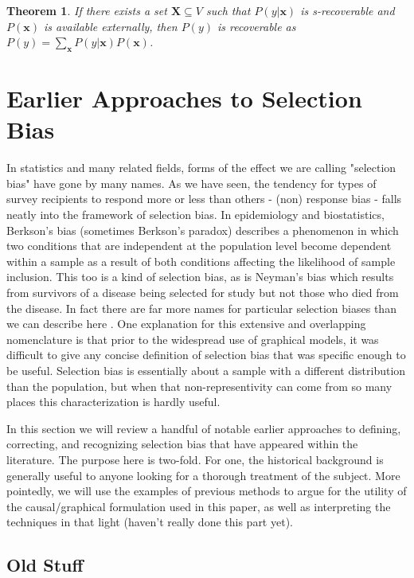 \documentclass[12pt,twoside]{reedthesis}
\newtheorem{theorem}{Theorem}
\theoremstyle{definition}
\begin{document}
\begin{theorem}
If there exists a set $\mathbf{X} \subseteq V$ such that $P(y|\mathbf{x})$ is s-recoverable and $P(\mathbf{x})$ is available externally, then $P(y)$ is recoverable as $P(y) = \sum_{\mathbf{x}} P(y|\mathbf{x})P(\mathbf{x})$.
\end{theorem}


\chapter{Earlier Approaches to Selection Bias}

In statistics and many related fields, forms of the effect we are calling "selection bias" have gone by many names. As we have seen,  the tendency for types of survey recipients to respond more or less than others - (non) response bias - falls neatly into the framework of selection bias. In epidemiology and biostatistics, Berkson's bias (sometimes Berkson's paradox) describes a phenomenon in which two conditions that are independent at the population level become dependent within a sample as a result of both conditions affecting the likelihood of sample inclusion. This too is a kind of selection bias, as is Neyman's bias which results from survivors of a disease being selected for study but not those who died from the disease. In fact there are far more names for particular selection biases than we can describe here \citep{Delgado_2008}. One explanation for this extensive and overlapping nomenclature is that prior to the widespread use of graphical models, it was difficult to give any concise definition of selection bias that was specific enough to be useful. Selection bias is essentially about a sample with a different distribution than the population, but when that non-representivity can come from so many places this characterization is hardly useful.

In this section we will review a handful of notable earlier approaches to defining, correcting, and recognizing selection bias that have appeared within the literature. The purpose here is two-fold. For one, the historical background is generally useful to anyone looking for a thorough treatment of the subject. More pointedly, we will use the examples of previous methods to argue for the utility of the causal/graphical formulation used in this paper, as well as interpreting the techniques in that light (haven't really done this part yet).

\section{Old Stuff}
\end{document}

